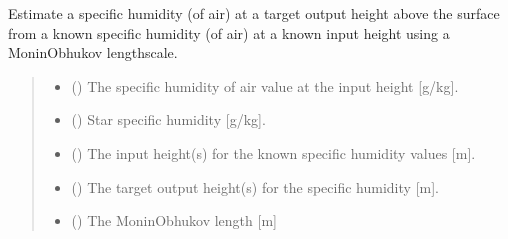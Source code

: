 \documentclass[letterpaper,10pt,english]{sphinxmanual}
\begin{document}
\begin{fulllineitems}
\label{\detokenize{users_guide:AirSeaFluxCode.height_subs.adjust_humidity}}
\pysigstartsignatures
\pysiglinewithargsret
{}
{\sphinxparamcomma {}\sphinxparamcomma {}\sphinxparamcomma {}\sphinxparamcomma {}\sphinxparamcomma {}}
{}
\pysigstopsignatures
\sphinxAtStartPar
Estimate a specific humidity (of air) at a target output height above the surface
from a known specific humidity (of air) at a known input height using a
Monin\sphinxhyphen{}Obhukov length\sphinxhyphen{}scale.
\begin{quote}\begin{description}
\begin{itemize}
\item {}
\sphinxAtStartPar
{} () \textendash{} The specific humidity of air value at the input height  {[}g/kg{]}.

\item {}
\sphinxAtStartPar
{} () \textendash{} Star specific humidity {[}g/kg{]}.

\item {}
\sphinxAtStartPar
{} (\sphinxstyleliteralemphasis{\sphinxupquote{ | }}) \textendash{} The input height(s) for the known specific humidity values {[}m{]}.

\item {}
\sphinxAtStartPar
{} (\sphinxstyleliteralemphasis{\sphinxupquote{ | }}) \textendash{} The target output height(s) for the specific humidity {[}m{]}.

\item {}
\sphinxAtStartPar
{} () \textendash{} The Monin\sphinxhyphen{}Obhukov length {[}m{]}


\end{itemize}
\end{description}
\end{quote}
\end{fulllineitems}
\end{document}
